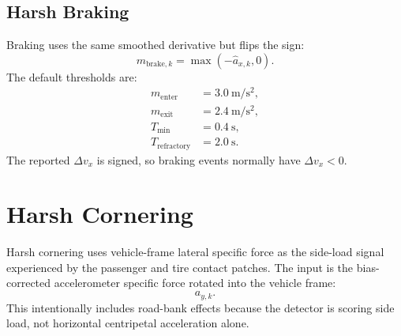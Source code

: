 \documentclass[11pt]{article}
\begin{document}
\subsection{Harsh Braking}

Braking uses the same smoothed derivative but flips the sign:
\begin{equation}
  m_{\mathrm{brake},k}=\max(-\hat{a}_{x,k},0).
\end{equation}
The default thresholds are:
\begin{align}
  m_{\mathrm{enter}} &= 3.0~\mathrm{m/s^2},\\
  m_{\mathrm{exit}} &= 2.4~\mathrm{m/s^2},\\
  T_{\min} &= 0.4~\mathrm{s},\\
  T_{\mathrm{refractory}} &= 2.0~\mathrm{s}.
\end{align}
The reported \(\Delta v_x\) is signed, so braking events normally have
\(\Delta v_x<0\).

\section{Harsh Cornering}

Harsh cornering uses vehicle-frame lateral specific force as the side-load
signal experienced by the passenger and tire contact patches. The input is the
bias-corrected accelerometer specific force rotated into the vehicle frame:
\begin{equation}
  a_{y,k}.
\end{equation}
This intentionally includes road-bank effects because the detector is scoring
side load, not horizontal centripetal acceleration alone.
\end{document}
